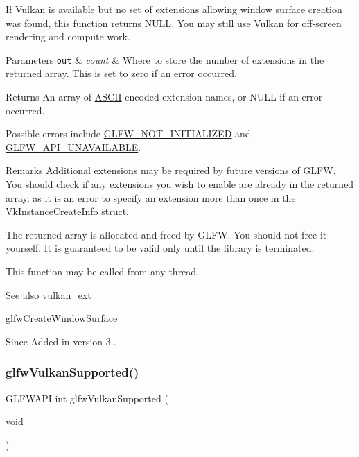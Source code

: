 If Vulkan is available but no set of extensions allowing window surface creation was found, this function returns {\ttfamily N\+U\+LL}. You may still use Vulkan for off-\/screen rendering and compute work.


\begin{DoxyParams}[1]{Parameters}
\mbox{\tt out}  & {\em count} & Where to store the number of extensions in the returned array. This is set to zero if an error occurred. \\
\hline
\end{DoxyParams}
\begin{DoxyReturn}{Returns}
An array of \hyperlink{structASCII}{A\+S\+C\+II} encoded extension names, or {\ttfamily N\+U\+LL} if an error occurred.
\end{DoxyReturn}
Possible errors include \hyperlink{group__errors_ga2374ee02c177f12e1fa76ff3ed15e14a}{G\+L\+F\+W\+\_\+\+N\+O\+T\+\_\+\+I\+N\+I\+T\+I\+A\+L\+I\+Z\+ED} and \hyperlink{group__errors_ga56882b290db23261cc6c053c40c2d08e}{G\+L\+F\+W\+\_\+\+A\+P\+I\+\_\+\+U\+N\+A\+V\+A\+I\+L\+A\+B\+LE}.

\begin{DoxyRemark}{Remarks}
Additional extensions may be required by future versions of G\+L\+FW. You should check if any extensions you wish to enable are already in the returned array, as it is an error to specify an extension more than once in the {\ttfamily Vk\+Instance\+Create\+Info} struct.
\end{DoxyRemark}
The returned array is allocated and freed by G\+L\+FW. You should not free it yourself. It is guaranteed to be valid only until the library is terminated.

This function may be called from any thread.

\begin{DoxySeeAlso}{See also}
vulkan\+\_\+ext 

glfw\+Create\+Window\+Surface
\end{DoxySeeAlso}
\begin{DoxySince}{Since}
Added in version 3.. 
\end{DoxySince}
\mbox{\label{group__vulkan_ga72e7c3757d9ff2333181a5569bb7c403}} 
\subsubsection{\texorpdfstring{glfw\+Vulkan\+Supported()}{glfwVulkanSupported()}}
{\footnotesize\ttfamily G\+L\+F\+W\+A\+PI int glfw\+Vulkan\+Supported (\begin{DoxyParamCaption}\item[{void}]{ }\end{DoxyParamCaption})}



